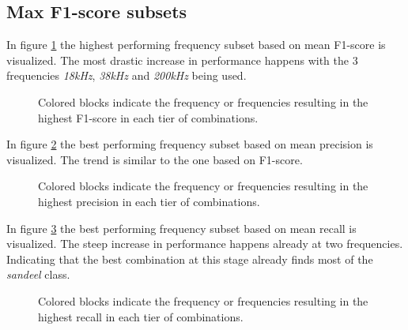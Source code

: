     
    
    \subsection{Max F1-score subsets}
        In figure \ref{increasing_freq_f1_score_fig} the highest performing frequency subset based on mean F1-score is visualized. The most drastic increase in performance happens with the 3 frequencies \textit{18kHz}, \textit{38kHz} and \textit{200kHz} being used.
        \begin{figure}[H]
            \centering
            
            \caption[Best frequency combination - F1-score]{Colored blocks indicate the frequency or frequencies resulting in the highest F1-score in each tier of combinations.}
          	\medskip 
            \label{increasing_freq_f1_score_fig}
        \end{figure}

        In figure \ref{increasing_freq_precision_score_fig} the best performing frequency subset based on mean precision is visualized. The trend is similar to the one based on F1-score.
        \begin{figure}[H]
            \centering
            
            \caption[Best frequency combination - Precision]{Colored blocks indicate the frequency or frequencies resulting in the highest precision in each tier of combinations.}
          	\medskip 
            \label{increasing_freq_precision_score_fig}
        \end{figure}
        
        In figure \ref{increasing_freq_recall_score_fig} the best performing frequency subset based on mean recall is visualized. The steep increase in performance happens already at two frequencies. Indicating that the best combination at this stage already finds most of the \textit{sandeel} class.
        \begin{figure}[H]
            \centering
            
            \caption[Best frequency combination - Recall]{Colored blocks indicate the frequency or frequencies resulting in the highest recall in each tier of combinations.}
          	\medskip 
            \label{increasing_freq_recall_score_fig}
        \end{figure}


